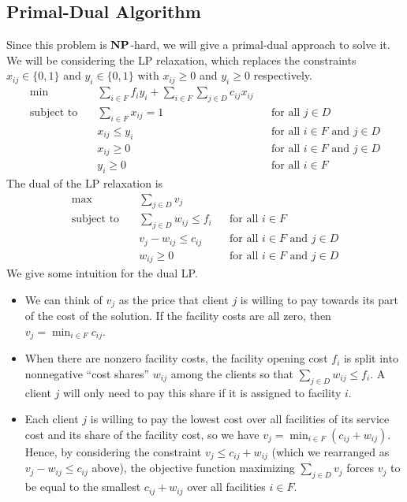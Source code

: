 \subsection{Primal-Dual Algorithm}
Since this problem is $\mathbf{NP}$-hard, we will give a primal-dual approach to solve it. 
We will be considering the LP relaxation, which replaces the constraints 
$x_{ij} \in \{0, 1\}$ and $y_i \in \{0, 1\}$ with $x_{ij} \geq 0$ and 
$y_i \geq 0$ respectively.
\begin{align*}
    \min\quad & \sum_{i\in F} f_i y_i + \sum_{i\in F} \sum_{j\in D} c_{ij} x_{ij} \\ 
    \text{subject to}\quad & \sum_{i\in F} x_{ij} = 1
    && \text{for all $j \in D$} \\
    & x_{ij} \leq y_i && \text{for all $i \in F$ and $j \in D$} \\
    & x_{ij} \geq 0 && \text{for all $i \in F$ and $j \in D$} \\ 
    & y_i \geq 0 && \text{for all $i \in F$}
\end{align*}
The dual of the LP relaxation is 
\begin{align*}
    \max\quad & \sum_{j\in D} v_j \\ 
    \text{subject to}\quad & \sum_{j\in D} w_{ij} \leq f_i
    && \text{for all $i \in F$} \\
    & v_j - w_{ij} \leq c_{ij} && \text{for all $i \in F$ and $j \in D$} \\
    & w_{ij} \geq 0 && \text{for all $i \in F$ and $j \in D$}
\end{align*}
We give some intuition for the dual LP. 
\begin{itemize} 
    \item We can think of $v_j$ as the price that client $j$ is willing to pay 
    towards its part of the cost of the solution. If the facility costs are all 
    zero, then $v_j = \min_{i\in F} c_{ij}$. 
    \item When there are nonzero facility costs, the facility opening cost $f_i$ 
    is split into nonnegative ``cost shares'' $w_{ij}$ among the clients so that 
    $\sum_{j\in D} w_{ij} \leq f_i$. A client $j$ will only need to pay this 
    share if it is assigned to facility $i$. 
    \item Each client $j$ is willing to pay the lowest cost over all facilities 
    of its service cost and its share of the facility cost, so we have 
    $v_j = \min_{i \in F} (c_{ij} + w_{ij})$. Hence, by considering the constraint 
    $v_j \leq c_{ij} + w_{ij}$ (which we rearranged as $v_j - w_{ij} \leq c_{ij}$ 
    above), the objective function maximizing $\sum_{j\in D} v_j$ forces 
    $v_j$ to be equal to the smallest $c_{ij} + w_{ij}$ over all facilities $i \in F$.
\end{itemize} 
